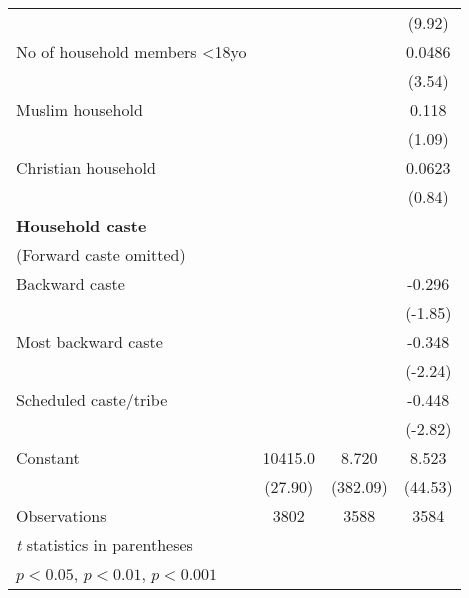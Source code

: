{\begin{tabular}{l*{3}{c}}
                    &                     &                     &      (9.92)         \\
[1em]
No of household members \textless{}18yo&                     &                     &      0.0486\sym{***}\\
                    &                     &                     &      (3.54)         \\
[1em]
Muslim household    &                     &                     &       0.118         \\
                    &                     &                     &      (1.09)         \\
[1em]
Christian household &                     &                     &      0.0623         \\
                    &                     &                     &      (0.84)         \\
[1em]
\textbf{Household caste} \\ (Forward caste omitted)&                     &                     &                     \\
[1em]
Backward caste      &                     &                     &      -0.296         \\
                    &                     &                     &     (-1.85)         \\
[1em]
Most backward caste &                     &                     &      -0.348\sym{*}  \\
                    &                     &                     &     (-2.24)         \\
[1em]
Scheduled caste/tribe&                     &                     &      -0.448\sym{**} \\
                    &                     &                     &     (-2.82)         \\
[1em]
Constant            &     10415.0\sym{***}&       8.720\sym{***}&       8.523\sym{***}\\
                    &     (27.90)         &    (382.09)         &     (44.53)         \\
\hline
Observations        &        3802         &        3588         &        3584         \\
\hline\hline
\multicolumn{4}{l}{\footnotesize \textit{t} statistics in parentheses}\\
\multicolumn{4}{l}{\footnotesize \sym{*} \(p<0.05\), \sym{**} \(p<0.01\), \sym{***} \(p<0.001\)}\\
\end{tabular}
}
